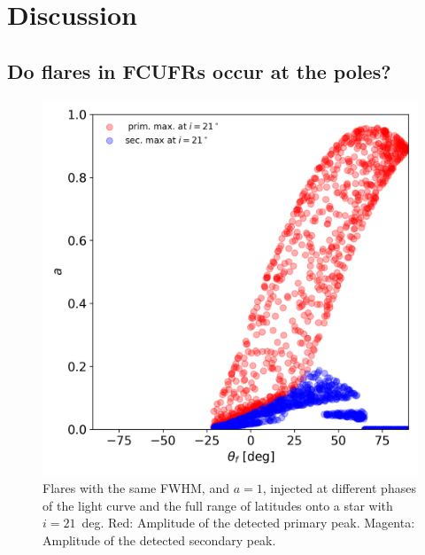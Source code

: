 \documentclass[fleqn,usenatbib,letters]{mnras}%
\begin{document}
\section{Discussion}
\label{sec:discussion}

\subsection{Do flares in FCUFRs occur at the poles?}

\begin{figure}
	\includegraphics[width=\columnwidth]{figures/237880881_21_deg_latitude_flare_compilation_scatter_2.png}
    \caption{Flares with the same FWHM, and $a=1$, injected at different phases of the light curve and the full range of latitudes onto a star with $i=21$~deg. Red: Amplitude of the detected primary peak. Magenta: Amplitude of the detected secondary peak.}
    \label{fig:discuss_low_lat}
\end{figure}
\end{document}
